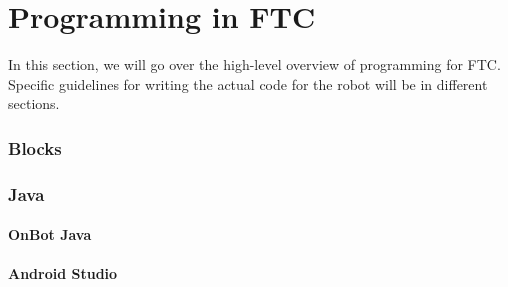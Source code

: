 \documentclass[../main.tex]{subfiles}
\begin{document}
\newpage
\part{Programming in FTC}

In this section, we will go over the high-level overview of programming for FTC. Specific guidelines for writing the actual code for the robot will be in different sections.
\section{Blocks}
\section{Java}
\subsection{OnBot Java}
\subsection{Android Studio}
\end{document}
